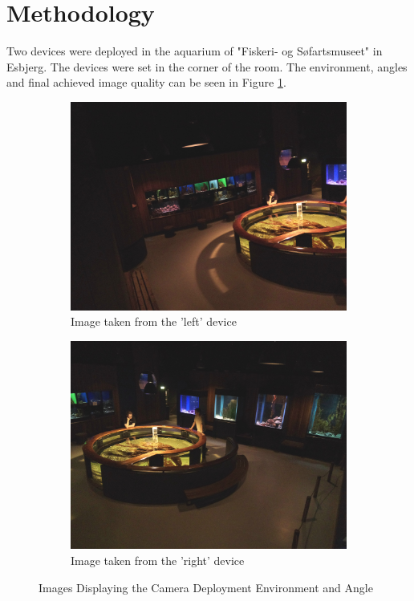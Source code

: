 \section{Methodology}
\label{sec:methodology}
Two devices were deployed in the aquarium of "Fiskeri- og Søfartsmuseet" in Esbjerg. The devices were set in the corner of the room. The environment, angles and final achieved image quality can be seen in Figure \ref{fig:device_deployments}.

\begin{figure}[H]
    \centering
    \begin{subfigure}{0.49\textwidth}
        \centering
        \includegraphics[width=\textwidth]{Images/DeviceImages/3rd/130524-155118_hm12.jpg}
        \caption{Image taken from the 'left' device}
    \end{subfigure}
    \hfill
    \begin{subfigure}{0.49\textwidth}
        \centering
        \includegraphics[width=\textwidth]{Images/DeviceImages/3rd/130524-155118_hm40.jpg}
        \caption{Image taken from the 'right' device}
    \end{subfigure}
    \caption{Images Displaying the Camera Deployment Environment and Angle}
    \label{fig:device_deployments}
\end{figure}

